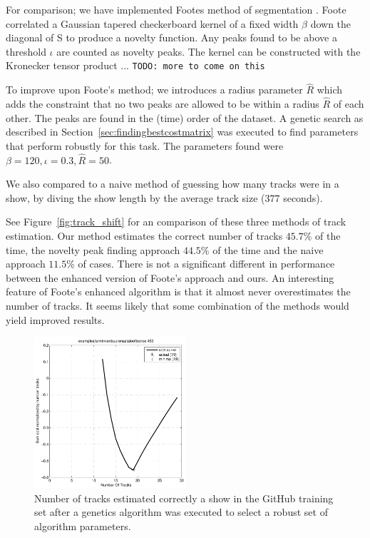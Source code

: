 \documentclass[twocolumn]{article}
\begin{document}
For comparison; we have implemented Footes method of segmentation \citep{foote2003media}. Foote correlated a Gaussian tapered checkerboard kernel of a fixed width $\beta$ down the diagonal of S to produce a novelty function. Any peaks found to be above a threshold $\iota$ are counted as novelty peaks. The kernel can be constructed with the Kronecker tensor product ... \texttt{TODO: more to come on this} 

To improve upon Foote's method; we introduces a radius parameter $\hat R$ which adds the constraint that no two peaks are allowed to be within a radius $\hat R$ of each other. The peaks are found in the (time) order of the dataset. A genetic search as described in Section~\ref{sec:findingbestcostmatrix} was executed to find parameters that perform robustly for this task. The parameters found were $\beta=120, \iota=0.3, \hat R=50$.

We also compared to a naive method of guessing how many tracks were in a show, by diving the show length by the average track size ($377$ seconds).

See Figure~\ref{fig:track_shift} for an comparison of these three methods of track estimation. Our method estimates the correct number of tracks $45.7$\% of the time, the novelty peak finding approach $44.5$\% of the time and the naive approach $11.5$\% of cases. There is not a significant different in performance between the enhanced version of Foote's approach and ours. An interesting feature of Foote's enhanced algorithm is that it almost never overestimates the number of tracks. It seems likely that some combination of the methods would yield improved results. 


\begin{figure}
	\centering
	\includegraphics[width=0.5\textwidth]{images/trackestimate}
	\caption{Number of tracks estimated correctly a show in the GitHub training set after a genetics algorithm was executed to select a robust set of algorithm parameters.}
	\label{fig:github_trackestimation}
\end{figure}
\end{document}

